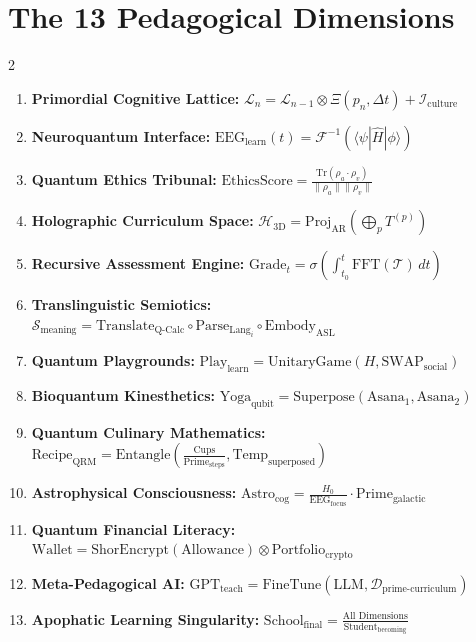 \documentclass[11pt]{article}
\theoremstyle{plain}
\theoremstyle{definition}
\begin{document}
\section{The 13 Pedagogical Dimensions}
\begin{multicols}{2}
\begin{enumerate}
    \item \textbf{Primordial Cognitive Lattice:} \( \mathcal{L}_n = \mathcal{L}_{n-1} \otimes \Xi(p_n, \Delta t) + \mathcal{I}_{\text{culture}} \)
    \item \textbf{Neuroquantum Interface:} \( \text{EEG}_{\text{learn}}(t) = \mathcal{F}^{-1}(\langle \psi | \hat{H} | \phi \rangle) \)
    \item \textbf{Quantum Ethics Tribunal:} \( \text{EthicsScore} = \frac{\text{Tr}(\rho_a \cdot \rho_v)}{\|\rho_a\|\|\rho_v\|} \)
    \item \textbf{Holographic Curriculum Space:} \( \mathcal{H}_{\text{3D}} = \text{Proj}_{\text{AR}}\left(\bigoplus_{p} T^{(p)}\right) \)
    \item \textbf{Recursive Assessment Engine:} \( \text{Grade}_t = \sigma\left( \int_{t_0}^t \text{FFT}(\mathcal{T}) \, dt \right) \)
    \item \textbf{Translinguistic Semiotics:} \( \mathcal{S}_{\text{meaning}} = \text{Translate}_{\text{Q-Calc}} \circ \text{Parse}_{\text{Lang}_i} \circ \text{Embody}_{\text{ASL}} \)
    \item \textbf{Quantum Playgrounds:} \( \text{Play}_{\text{learn}} = \text{UnitaryGame}(H, \text{SWAP}_{\text{social}}) \)
    \item \textbf{Bioquantum Kinesthetics:} \( \text{Yoga}_{\text{qubit}} = \text{Superpose}(\text{Asana}_1, \text{Asana}_2) \)
    \item \textbf{Quantum Culinary Mathematics:} \( \text{Recipe}_{\text{QRM}} = \text{Entangle}( \frac{\text{Cups}}{\text{Prime}_{\text{steps}}}, \text{Temp}_{\text{superposed}} ) \)
    \item \textbf{Astrophysical Consciousness:} \( \text{Astro}_{\text{cog}} = \frac{H_0}{\text{EEG}_{\text{focus}}} \cdot \text{Prime}_{\text{galactic}} \)
    \item \textbf{Quantum Financial Literacy:} \( \text{Wallet} = \text{ShorEncrypt}(\text{Allowance}) \otimes \text{Portfolio}_{\text{crypto}} \)
    \item \textbf{Meta-Pedagogical AI:} \( \text{GPT}_{\text{teach}} = \text{FineTune}(\text{LLM}, \mathcal{D}_{\text{prime-curriculum}}) \)
    \item \textbf{Apophatic Learning Singularity:} \( \text{School}_{\text{final}} = \frac{\text{All Dimensions}}{\text{Student}_{\text{becoming}}} \)
\end{enumerate}
\end{multicols}
\end{document}
